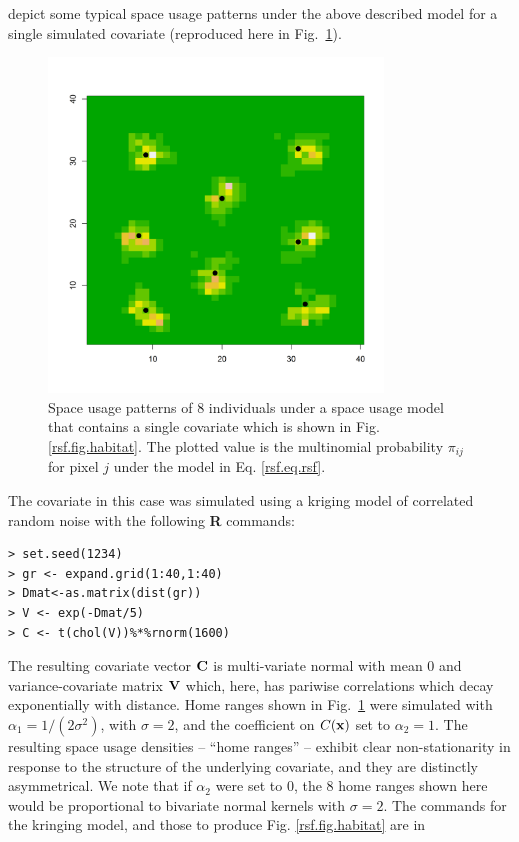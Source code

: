 \citet{royle_etal:2012mee} depict some typical space
usage patterns under the above described model for a single simulated covariate 
(reproduced here in Fig.~\ref{rsf.fig.homeranges}).
\begin{figure}[ht]
\centering
\includegraphics[width=3.5in,height=3.5in]{Ch13-RSF/figs/homeranges8}
\caption{Space usage patterns of 8 individuals under a space usage
  model that contains a single covariate which is shown in
  Fig. \ref{rsf.fig.habitat}. The plotted value is the multinomial
  probability $\pi_{ij}$ for pixel $j$ under the model in Eq. \ref{rsf.eq.rsf}.
}
\label{rsf.fig.homeranges}
\end{figure}
The covariate in this case was simulated using a kriging
model of correlated random noise
with the following {\bf R} commands:
\begin{verbatim}
> set.seed(1234)
> gr <- expand.grid(1:40,1:40)
> Dmat<-as.matrix(dist(gr))
> V <- exp(-Dmat/5)
> C <- t(chol(V))%*%rnorm(1600)
\end{verbatim}
The resulting covariate vector ${\bf C}$ is multi-variate normal with
mean 0 and variance-covariate matrix ${\bf V}$ which, here, has
pariwise correlations which decay exponentially with distance. 
Home ranges shown in Fig.~\ref{rsf.fig.homeranges} were simulated
with $\alpha_{1} =
1/(2\sigma^2)$, with $\sigma = 2$, and the coefficient on $C({\bf x})$
set to $\alpha_{2} = 1$. The resulting space usage densities -- ``home ranges'' -- exhibit clear
non-stationarity in response to the structure of the underlying
covariate, and they are distinctly asymmetrical.  We note that if
$\alpha_{2}$ were set to 0, the 8 home ranges shown here would
be proportional to bivariate normal kernels with $\sigma = 2$.
The commands for the kringing model, and those to produce Fig. \ref{rsf.fig.habitat} are in
